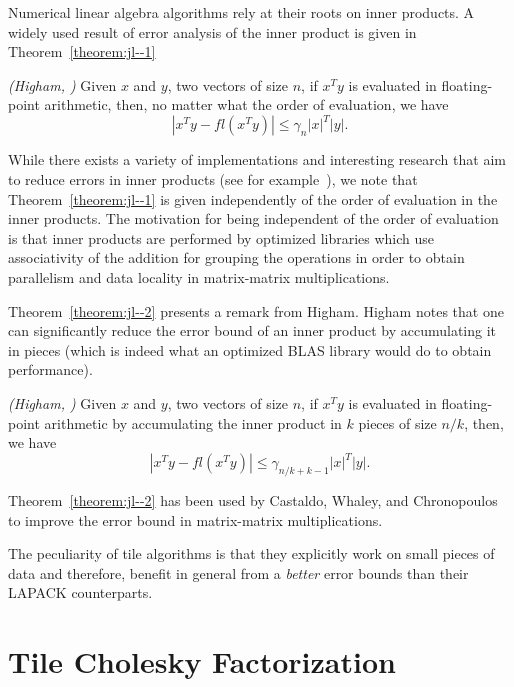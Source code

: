 Numerical linear algebra algorithms rely at their roots on inner products.
A widely used result of error analysis of the inner product is given in Theorem~\ref{theorem:jl--1} 
\begin{theorem}\emph{(Higham, \cite[Eq.(3.5)]{Higham:2002:ASN})}
\label{theorem:jl--1}
Given $x$ and $y$, two vectors of size $n$, 
if $x^Ty$ is evaluated in floating-point arithmetic, then, 
no matter what the order of evaluation, we have
\begin{equation*}
| x^T y - fl( x^T y ) | \leq \gamma_n |x |^T |y |.
\end{equation*}
\end{theorem}
While there exists a variety of implementations and interesting research that
aim to reduce errors in inner products (see for
example~\cite[chapter~3~and~4]{Higham:2002:ASN}), we note that
Theorem~\ref{theorem:jl--1}
 is given independently of the order of evaluation in the inner
products.  The motivation for being independent of the order of evaluation is
that inner products are performed by optimized libraries which use
associativity of the addition for grouping the operations in order to obtain
parallelism and data locality in matrix-matrix multiplications.

Theorem~\ref{theorem:jl--2} presents a remark from Higham.
Higham notes that one can significantly reduce the error bound of an inner
product by accumulating it in pieces (which is indeed what an optimized BLAS library would do
to obtain performance).
\begin{theorem}\emph{(Higham, \cite[\S3.1]{Higham:2002:ASN})}
\label{theorem:jl--2}
Given $x$ and $y$, two vectors of size $n$, 
if $x^Ty$ is evaluated in floating-point arithmetic
 by accumulating the inner product in $k$ pieces of size $n/k$,
then, we have
\begin{equation*}
| x^T y - fl( x^T y ) | \leq \gamma_{n/k+k-1} |x |^T |y |.
\end{equation*}
\end{theorem}
Theorem~\ref{theorem:jl--2} has been used by
Castaldo, Whaley, and Chronopoulos~\cite{Castaldo:2008:RFP} to improve the 
error bound in matrix-matrix multiplications.

The peculiarity of tile algorithms is that they explicitly work on small pieces of data
and therefore, benefit in general from a {\em better} error bounds than their LAPACK counterparts.

\section{Tile Cholesky Factorization}

